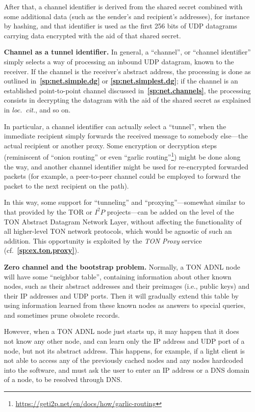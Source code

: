 \documentclass[12pt,oneside]{article}
\def\makepoint#1{\medbreak\noindent{\bf #1.\ }}
\def\nxsubpoint{\refstepcounter{subsubsection}%
  \smallbreak\makepoint{\thesubsubsection}}
\def\refpoint#1{{\rm\textbf{\ref{#1}}}}
\let\ptref=\refpoint
\def\embt(#1.){\textbf{#1.}}
\begin{document}
After that, a channel identifier is derived from the shared secret
combined with some additional data (such as the sender's and
recipient's addresses), for instance by hashing, and that identifier
is used as the first 256 bits of UDP datagrams carrying data encrypted
with the aid of that shared secret.

\nxsubpoint\label{sp:tunnels} \embt(Channel as a tunnel identifier.)
In general, a ``channel'', or ``channel identifier'' simply selects a
way of processing an inbound UDP datagram, known to the receiver. If
the channel is the receiver's abstract address, the processing is done
as outlined in~\ptref{sp:net.simple.dg} or \ptref{sp:net.simplest.dg};
if the channel is an established point-to-point channel discussed
in~\ptref{sp:net.channels}, the processing consists in decrypting the
datagram with the aid of the shared secret as explained in {\em
  loc.~cit.}, and so on.

In particular, a channel identifier can actually select a ``tunnel'',
when the immediate recipient simply forwards the received message to
somebody else---the actual recipient or another proxy. Some encryption
or decryption steps (reminiscent of ``onion routing'' \cite{Onion} or
even ``garlic
routing''\footnote{\url{https://geti2p.net/en/docs/how/garlic-routing}})
might be done along the way, and another channel identifier might be
used for re-encrypted forwarded packets (for example, a peer-to-peer
channel could be employed to forward the packet to the next recipient
on the path).

In this way, some support for ``tunneling'' and
``proxying''---somewhat similar to that provided by the TOR or $I^2P$
projects---can be added on the level of the TON Abstract Datagram
Network Layer, without affecting the functionality of all higher-level
TON network protocols, which would be agnostic of such an
addition. This opportunity is exploited by the {\em TON Proxy\/}
service (cf.~\ptref{sp:ex.ton.proxy}).

\nxsubpoint\label{sp:net.startup} \embt(Zero channel and the bootstrap
problem.)  Normally, a TON ADNL node will have some ``neighbor
table'', containing information about other known nodes, such as their
abstract addresses and their preimages (i.e., public keys) and their
IP addresses and UDP ports. Then it will gradually extend this table
by using information learned from these known nodes as answers to
special queries, and sometimes prune obsolete records.

However, when a TON ADNL node just starts up, it may happen that it
does not know any other node, and can learn only the IP address and
UDP port of a node, but not its abstract address. This happens, for
example, if a light client is not able to access any of the previously
cached nodes and any nodes hardcoded into the software, and must ask
the user to enter an IP address or a DNS domain of a node, to be
resolved through DNS.
\end{document}
